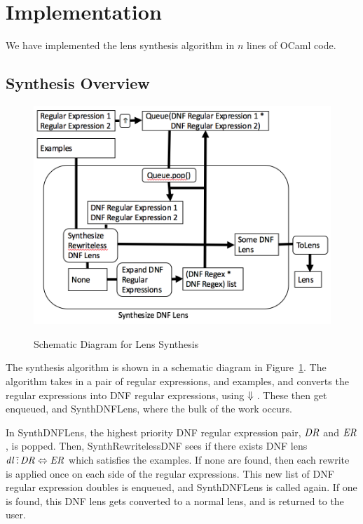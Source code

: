 \documentclass[numbers]{sigplanconf}
\begin{document}
\section{Implementation}
We have implemented the lens synthesis algorithm in $n$ lines of OCaml code.

\subsection{Synthesis Overview}
\begin{figure}
  \includegraphics[scale=.5]{synth-lens-schematic.png}
  \label{fig:synth-lens-schematic}
  \caption{Schematic Diagram for Lens Synthesis}
\end{figure}
The synthesis algorithm is shown in a schematic diagram in 
Figure~\ref{fig:synth-lens-schematic}.  The algorithm takes in a pair of
regular expressions, and examples, and converts the regular expressions into
DNF regular expressions, using $\Downarrow{}$.
These then get enqueued, and SynthDNFLens, where the bulk of the work
occurs.

In SynthDNFLens, the highest priority DNF regular expression pair, $\mathit{DR}$
and $\mathit{ER}$, is popped.
Then, SynthRewritelessDNF sees if there exists DNF lens $\mathit{dl}
\,\tilde{:}\, \mathit{DR} \Leftrightarrow \mathit{ER}$ which satisfies the examples.
If none are found, then each rewrite is applied once on each side of the regular
expressions.
This new list of DNF regular expression doubles is enqueued, and SynthDNFLens is
called again.
If one is found, this DNF lens gets converted to a normal lens, and is returned
to the user.
\end{document}
